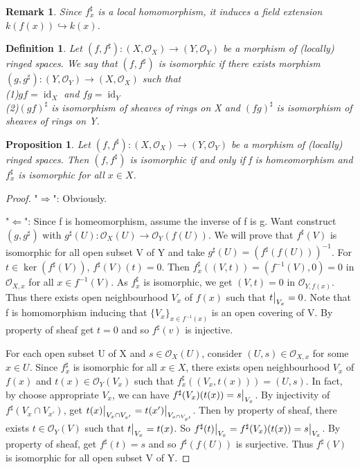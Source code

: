 \documentclass{ctexart}
\newtheorem{definition}{Definition}[section]
\newtheorem{remark}{Remark}[section]
\newtheorem{proposition}{Proposition}[section]
\newcommand{\identity}{\operatorname{id}}
\begin{document}
\begin{remark}
    Since $f_{x}^{\sharp}$ is a local homomorphism, it induces a field extension $k(f(x)) \hookrightarrow k(x)$.
\end{remark}
\begin{definition}
    Let $(f, f^{\sharp}): (X, \mathcal{O}_{X}) \longrightarrow (Y, \mathcal{O}_{Y})$ be a morphism of (locally) ringed spaces.
    We say that $(f, f^{\sharp})$ is isomorphic if there exists morphism $(g, g^{\sharp}): (Y, \mathcal{O}_{Y}) \longrightarrow (X, \mathcal{O}_{X})$ such that \\
    (1)$gf = \identity_{X}$ and $fg = \identity_{Y}$ \\
    (2)$(gf)^{\sharp}$ is isomorphism of sheaves of rings on X and $(fg)^{\sharp}$ is isomorphism of sheaves of rings on Y.
\end{definition}
\begin{proposition}
    Let $(f, f^{\sharp}): (X, \mathcal{O}_{X}) \longrightarrow (Y, \mathcal{O}_{Y})$ be a morphism of (locally) ringed spaces.
    Then $(f, f^{\sharp})$ is isomorphic if and only if f is homeomorphism and $f_{x}^{\sharp}$ is isomorphic for all $x\in X$.
    \label{Proposition 1.11}
\end{proposition}
\begin{proof}
    "$\Rightarrow$": Obviously.
    \par
    "$\Leftarrow$": Since f is homeomorphism, assume the inverse of f is g.
    Want construct $(g, g^{\sharp})$ with $g^{\sharp}(U): \mathcal{O}_{X}(U) \longrightarrow \mathcal{O}_{Y}(f(U))$.
    We will prove that $f^{\sharp}(V)$ is isomorphic for all open subset V of Y and take $g^{\sharp}(U) = (f^{\sharp}(f(U)))^{-1}$.
    For $t\in \ker(f^{\sharp}(V))$, $f^{\sharp}(V)(t) = 0$.
    Then $f_{x}^{\sharp}((V, t)) = (f^{-1}(V), 0) = 0$ in $\mathcal{O}_{X, x}$ for all $x\in f^{-1}(V)$.
    As $f_{x}^{\sharp}$ is isomorphic, we get $(V, t) = 0$ in $\mathcal{O}_{Y, f(x)}$.
    Thus there exists open neighbourhood $V_{x}$ of $f(x)$ such that $t\big{|}_{V_{x}} = 0$.
    Note that f is homomorphism inducing that $\{V_{x}\}_{x\in f^{-1}(x)}$ is an open covering of V.
    By property of sheaf get $t = 0$ and so $f^{\sharp}(v)$ is injective. 
    \par
    For each open subset U of X and $s\in \mathcal{O}_{X}(U)$, consider $(U, s)\in \mathcal{O}_{X, x}$ for some $x\in U$.
    Since $f_{x}^{\sharp}$ is isomorphic for all $x\in X$, there exists open neighbourhood $V_{x}$ of $f(x)$ and $t(x)\in \mathcal{O}_{Y}(V_{x})$ such that $f_{x}^{\sharp}((V_{x}, t(x))) = (U, s)$.
    In fact, by choose appropriate $V_{x}$, we can have $f^{\sharp}(V_{x})(t(x)) = s\big{|}_{V_{x}}$.
    By injectivity of $f^{\sharp}(V_{x} \cap V_{x'})$, get $t(x)\big{|}_{V_{x} \cap V_{x'}} = t(x')\big{|}_{V_{x \cap V_{x'}}}$.
    Then by property of sheaf, there exists $t\in \mathcal{O}_{Y}(V)$ such that $t\big{|}_{V_{x}} = t(x)$.
    So $f^{\sharp}(t)\big{|}_{V_{x}} = f^{\sharp}(V_{x})(t(x)) = s\big{|}_{V_{x}}$.
    By property of sheaf, get $f^{\sharp}(t) = s$ and so $f^{\sharp}(f(U))$ is surjective.
    Thus $f^{\sharp}(V)$ is isomorphic for all open subset V of Y.
\end{proof}
\end{document}

